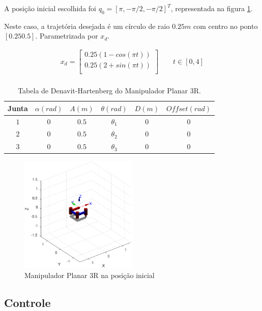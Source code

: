 \documentclass[a4paper,11pt]{article}
\theoremstyle{mytheor}
\begin{document}
A posição inicial escolhida foi $ q_0 = [\pi, -\pi/2, -\pi/2]^T $, representada na figura \ref{fig:ex2_ready}.

Neste caso, a trajetória desejada é um círculo de raio $0.25m$ com centro no ponto $[0.25 0.5]$. Parametrizada por $x_d$.


   	\begin{gather*}
	x_{d} = 
	\begin{bmatrix} 
	0.25 (1 - cos(\pi t)) \\ 
	0.25 (2 + sin(\pi t)) \\
	\end{bmatrix} \qquad t \in [0,4] \\
	\end{gather*}


\begin{table}[!ht]
\centering
\caption{Tabela de Denavit-Hartenberg do Manipulador Planar 3R.}
\label{tab:ex2_dh}

\begin{tabular}{|c|c|c|c|c|c|}
\hline
Junta  & $\alpha (rad)$ & $A (m)$ & $\theta (rad)$ & $D (m)$ & $Offset (rad)$ \\ \hline
$1$  & 0 & $0.5$ & $\theta_1$ & 0 & 0 \\ \hline
$2$  & 0 & $0.5$ & $\theta_2$ & 0 & 0 \\ \hline
$3$  & 0 & $0.5$ & $\theta_3$ & 0 & 0 \\ \hline

\end{tabular}
\end{table}

\begin{figure}[!ht]
\centering
\includegraphics[width=0.5\textwidth]{figs/ex2_planar_tetha0.pdf}
\caption{Manipulador Planar 3R na posição inicial}
\label{fig:ex2_ready}
\end{figure}

\subsection{Controle}
\end{document}
